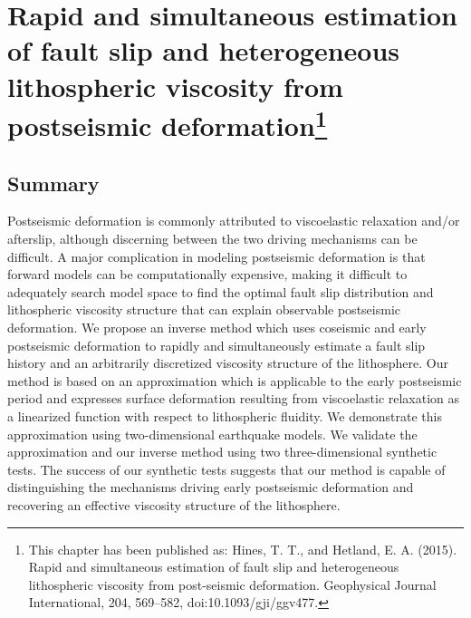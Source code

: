 \chapter
[Rapid and simultaneous estimation of fault slip and heterogeneous
lithospheric viscosity from postseismic deformation]
{Rapid and simultaneous estimation of fault slip and heterogeneous
lithospheric viscosity from postseismic deformation\footnote[1]{
This chapter has been published as: Hines, T. T., and Hetland, E. A.
(2015). Rapid and simultaneous estimation of fault slip and
heterogeneous lithospheric viscosity from post-seismic deformation.
Geophysical Journal International, 204, 569–582,
doi:10.1093/gji/ggv477.}}

\section{Summary}
Postseismic deformation is commonly attributed to viscoelastic
relaxation and/or afterslip, although discerning between the two
driving mechanisms can be difficult.  A major complication in modeling
postseismic deformation is that forward models can be computationally
expensive, making it difficult to adequately search model space to
find the optimal fault slip distribution and lithospheric viscosity
structure that can explain observable postseismic deformation.  We
propose an inverse method which uses coseismic and early postseismic
deformation to rapidly and simultaneously estimate a fault slip
history and an arbitrarily discretized viscosity structure of the
lithosphere. Our method is based on an approximation which is
applicable to the early postseismic period and expresses surface
deformation resulting from viscoelastic relaxation as a linearized
function with respect to lithospheric fluidity.  We demonstrate this
approximation using two-dimensional earthquake models.  We validate
the approximation and our inverse method using two three-dimensional
synthetic tests. The success of our synthetic tests suggests that our
method is capable of distinguishing the mechanisms driving early
postseismic deformation and recovering an effective viscosity
structure of the lithosphere.

